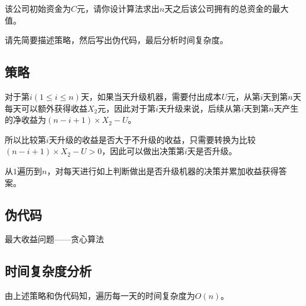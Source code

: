 \documentclass{article}
\begin{document}
该公司初始资金为$C$元，请你设计算法求出$n$天之后该公司拥有的总资金的最大值。

请先简要描述策略，然后写出伪代码，最后分析时间复杂度。

\subsection{策略} %

对于第$i(1 \le i \le n)$天，如果当天升级机器，需要付出成本$U$元，从第$i$天到第$n$天每天可以额外获得收益$X_2$元，因此对于第$i$天升级来说，后续从第$i$天到第$n$天产生的净收益为$ (n - i + 1) \times X_2 - U$。

所以比较第$i$天升级的收益是否大于不升级的收益，只需要转换为比较$(n - i + 1) \times X_2 - U > 0$，因此可以做出决策第$i$天是否升级。

从$1$遍历到$n$，对每天进行如上判断做出是否升级机器的决策并累加收益获得答案。

\subsection{伪代码} %


\begin{algorithm}[H]

\caption{最大收益问题——贪心算法}
\LinesNumbered
{}


\end{algorithm}

\subsection{时间复杂度分析}
由上述策略和伪代码知，遍历每一天的时间复杂度为$O(n)$。
\end{document}
